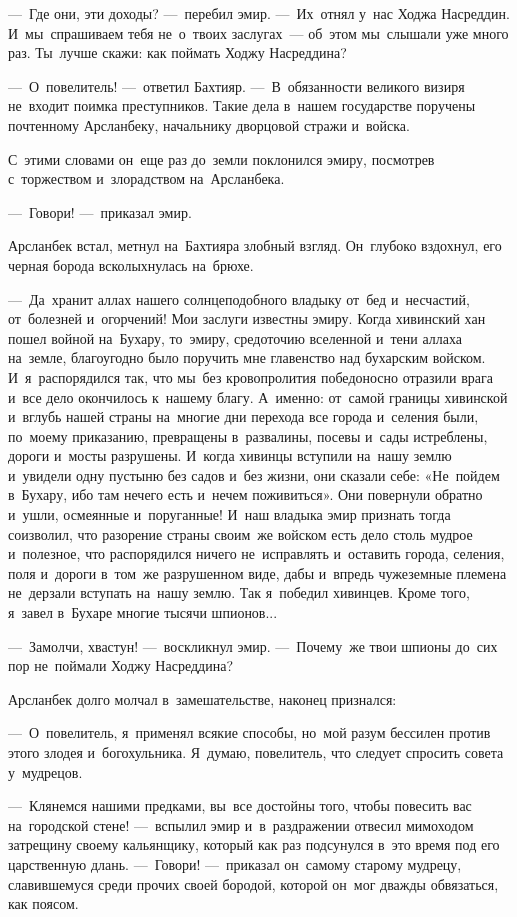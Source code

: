\documentclass[12pt,a4paper]{book}
\begin{document}
—~Где они, эти доходы? —~перебил эмир. —~Их~отнял у~нас Ходжа Насреддин. И~мы~спрашиваем тебя не~о~твоих заслугах~— об~этом мы~слышали уже много раз. Ты~лучше скажи: как поймать Ходжу Насреддина?

—~О~повелитель! —~ответил Бахтияр. —~В~обязанности великого визиря не~входит поимка преступников. Такие дела в~нашем государстве поручены почтенному Арсланбеку, начальнику дворцовой стражи и~войска.

С~этими словами он~еще раз до~земли поклонился эмиру, посмотрев с~торжеством и~злорадством на~Арсланбека.

—~Говори! —~приказал эмир.

Арсланбек встал, метнул на~Бахтияра злобный взгляд. Он~глубоко вздохнул, его черная борода всколыхнулась на~брюхе.

—~Да~хранит аллах нашего солнцеподобного владыку от~бед и~несчастий, от~болезней и~огорчений! Мои заслуги известны эмиру. Когда хивинский хан пошел войной на~Бухару, то~эмиру, средоточию вселенной и~тени аллаха на~земле, благоугодно было поручить мне главенство над бухарским войском. И~я~распорядился так, что мы~без кровопролития победоносно отразили врага и~все дело окончилось к~нашему благу. А~именно: от~самой границы хивинской и~вглубь нашей страны на~многие дни перехода все города и~селения были, по~моему приказанию, превращены в~развалины, посевы и~сады истреблены, дороги и~мосты разрушены. И~когда хивинцы вступили на~нашу землю и~увидели одну пустыню без садов и~без жизни, они сказали себе: «Не~пойдем в~Бухару, ибо там нечего есть и~нечем поживиться». Они повернули обратно и~ушли, осмеянные и~поруганные! И~наш владыка эмир признать тогда соизволил, что разорение страны своим~же войском есть дело столь мудрое и~полезное, что распорядился ничего не~исправлять и~оставить города, селения, поля и~дороги в~том~же разрушенном виде, дабы и~впредь чужеземные племена не~дерзали вступать на~нашу землю. Так я~победил хивинцев. Кроме того, я~завел в~Бухаре многие тысячи шпионов...

—~Замолчи, хвастун! —~воскликнул эмир. —~Почему~же твои шпионы до~сих пор не~поймали Ходжу Насреддина?

Арсланбек долго молчал в~замешательстве, наконец признался:

—~О~повелитель, я~применял всякие способы, но~мой разум бессилен против этого злодея и~богохульника. Я~думаю, повелитель, что следует спросить совета у~мудрецов.

—~Клянемся нашими предками, вы~все достойны того, чтобы повесить вас на~городской стене! —~вспылил эмир и~в~раздражении отвесил мимоходом затрещину своему кальянщику, который как раз подсунулся в~это время под его царственную длань. —~Говори! —~приказал он~самому старому мудрецу, славившемуся среди прочих своей бородой, которой он~мог дважды обвязаться, как поясом.
\end{document}
